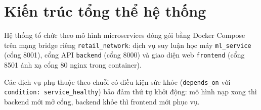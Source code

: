 \documentclass[12pt,a4paper]{report}
\begin{document}
\section{Kiến trúc tổng thể hệ thống}

Hệ thống tổ chức theo mô hình microservices đóng gói bằng Docker Compose trên mạng bridge riêng \texttt{retail\_network}: dịch vụ suy luận học máy \texttt{ml\_service} (cổng 8001), cổng API \texttt{backend} (cổng 8000) và giao diện web \texttt{frontend} (cổng 8501 ánh xạ cổng 80 nginx trong container).

Các dịch vụ phụ thuộc theo chuỗi có điều kiện sức khỏe (\texttt{depends\_on} với \texttt{condition: service\_healthy}) bảo đảm thứ tự khởi động: mô hình nạp xong thì backend mới mở cổng, backend khỏe thì frontend mới phục vụ.

\end{document}
